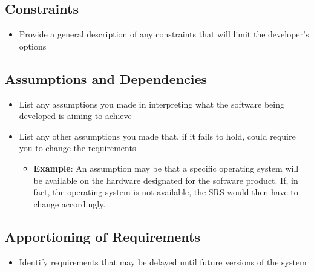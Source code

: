 \documentclass[]{article}
\begin{document}
\subsection{Constraints}
\label{sub:constraints}
\begin{itemize}
	\item Provide a general description of any constraints that will limit the developer's options
\end{itemize}

\subsection{Assumptions and Dependencies}
\label{sub:assumptions_and_dependencies}
\begin{itemize}
	\item List any assumptions you made in interpreting what the software being developed is aiming to achieve
	\item List any other assumptions you made that, if it fails to hold, could require you to change the requirements
	\begin{itemize}
		\item \textbf{Example}: An assumption may be that a specific operating system will be available on the hardware designated for the software product. If, in fact, the operating system is not available, the SRS would then have to change accordingly.
	\end{itemize}
\end{itemize}

\subsection{Apportioning of Requirements}
\label{sub:apportioning_of_requirements}
\begin{itemize}
	\item Identify requirements that may be delayed until future versions of the system
\end{itemize}

\end{document}
